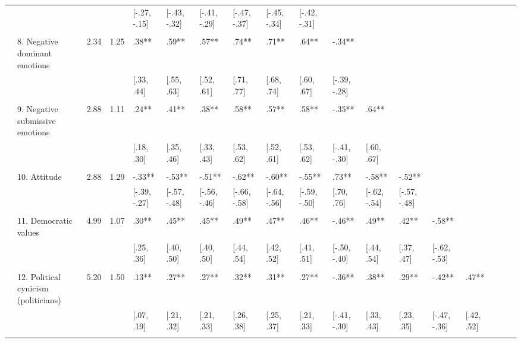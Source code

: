 \documentclass[
]{article}
\begin{document}
\begin{landscape}
\begin{table}
{\begin{tabular}[t]{llllllllllllllllll}
 &  &  &  & {}[-.27, -.15] & {}[-.43, -.32] & {}[-.41, -.29] & {}[-.47, -.37] & {}[-.45, -.34] & {}[-.42, -.31] &  &  &  &  &  &  &  & \\
 &  &  &  &  &  &  &  &  &  &  &  &  &  &  &  &  & \\
 & 8. Negative dominant emotions & 2.34 & 1.25 & .38** & .59** & .57** & .74** & .71** & .64** & -.34** &  &  &  &  &  &  & \\
 &  &  &  & {}[.33, .44] & {}[.55, .63] & {}[.52, .61] & {}[.71, .77] & {}[.68, .74] & {}[.60, .67] & {}[-.39, -.28] &  &  &  &  &  &  & \\
 &  &  &  &  &  &  &  &  &  &  &  &  &  &  &  &  & \\
 & 9. Negative submissive emotions & 2.88 & 1.11 & .24** & .41** & .38** & .58** & .57** & .58** & -.35** & .64** &  &  &  &  &  & \\
 &  &  &  & {}[.18, .30] & {}[.35, .46] & {}[.33, .43] & {}[.53, .62] & {}[.52, .61] & {}[.53, .62] & {}[-.41, -.30] & {}[.60, .67] &  &  &  &  &  & \\
 &  &  &  &  &  &  &  &  &  &  &  &  &  &  &  &  & \\
 & 10. Attitude & 2.88 & 1.29 & -.33** & -.53** & -.51** & -.62** & -.60** & -.55** & .73** & -.58** & -.52** &  &  &  &  & \\
 &  &  &  & {}[-.39, -.27] & {}[-.57, -.48] & {}[-.56, -.46] & {}[-.66, -.58] & {}[-.64, -.56] & {}[-.59, -.50] & {}[.70, .76] & {}[-.62, -.54] & {}[-.57, -.48] &  &  &  &  & \\
 &  &  &  &  &  &  &  &  &  &  &  &  &  &  &  &  & \\
 & 11. Democratic values & 4.99 & 1.07 & .30** & .45** & .45** & .49** & .47** & .46** & -.46** & .49** & .42** & -.58** &  &  &  & \\
 &  &  &  & {}[.25, .36] & {}[.40, .50] & {}[.40, .50] & {}[.44, .54] & {}[.42, .52] & {}[.41, .51] & {}[-.50, -.40] & {}[.44, .54] & {}[.37, .47] & {}[-.62, -.53] &  &  &  & \\
 &  &  &  &  &  &  &  &  &  &  &  &  &  &  &  &  & \\
 & 12. Political cynicism (politicians) & 5.20 & 1.50 & .13** & .27** & .27** & .32** & .31** & .27** & -.36** & .38** & .29** & -.42** & .47** &  &  & \\
 &  &  &  & {}[.07, .19] & {}[.21, .32] & {}[.21, .33] & {}[.26, .38] & {}[.25, .37] & {}[.21, .33] & {}[-.41, -.30] & {}[.33, .43] & {}[.23, .35] & {}[-.47, -.36] & {}[.42, .52] &  &  & \\
 &  &  &  &  &  &  &  &  &  &  &  &  &  &  &  &  & \\

\end{tabular}}
\end{table}
\end{landscape}
\end{document}
